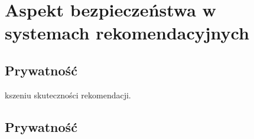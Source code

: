 
\chapter{Aspekt bezpieczeństwa w systemach rekomendacyjnych}

\section{Prywatność}kszeniu skuteczności rekomendacji.

\section{Prywatność}